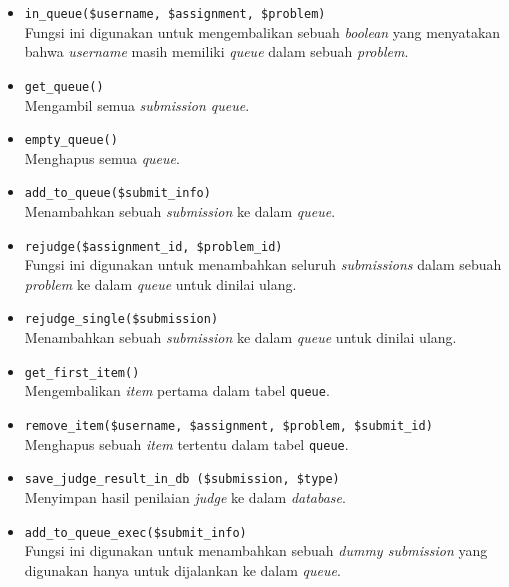 \documentclass[a4paper,twoside]{article}
\begin{document}
\begin{enumerate}
\begin{itemize}
\begin{itemize}
			                  \begin{itemize}
				                  \item \verb|in_queue($username, $assignment, $problem)| \\
				                        Fungsi ini digunakan untuk mengembalikan sebuah \textit{boolean} yang menyatakan bahwa \textit{username} masih memiliki \textit{queue} dalam sebuah \textit{problem}.
				                  \item \verb|get_queue()| \\
				                        Mengambil semua \textit{submission queue}.
				                  \item \verb|empty_queue()| \\
				                        Menghapus semua \textit{queue}.
				                  \item \verb|add_to_queue($submit_info)| \\
				                        Menambahkan sebuah \textit{submission} ke dalam \textit{queue}.
				                  \item \verb|rejudge($assignment_id, $problem_id)| \\
				                        Fungsi ini digunakan untuk menambahkan seluruh \textit{submissions} dalam sebuah \textit{problem} ke dalam \textit{queue} untuk dinilai ulang.
				                  \item \verb|rejudge_single($submission)| \\
				                        Menambahkan sebuah \textit{submission} ke dalam \textit{queue} untuk dinilai ulang.
				                  \item \verb|get_first_item()| \\
				                        Mengembalikan \textit{item} pertama dalam tabel \verb|queue|.
				                  \item \verb|remove_item($username, $assignment, $problem, $submit_id)| \\
				                        Menghapus sebuah \textit{item} tertentu dalam tabel \verb|queue|.
				                  \item \verb|save_judge_result_in_db ($submission, $type)| \\
				                        Menyimpan hasil penilaian \textit{judge} ke dalam \textit{database}.
				                  \item \verb|add_to_queue_exec($submit_info)| \\
				                        Fungsi ini digunakan untuk menambahkan sebuah \textit{dummy submission} yang digunakan hanya untuk dijalankan ke dalam \textit{queue}.
			                  \end{itemize}


\end{itemize}
\end{itemize}
\end{enumerate}
\end{document}
